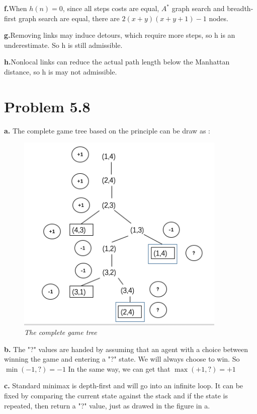 \documentclass[a4paper,left=2.5cm,right=2.5cm,11pt]{article}
\begin{document}
\textbf{f.}When $h(n)=0$, since all steps costs are equal, $A^*$ graph search and breadth-first graph search are equal, there are $2(x+y)(x+y+1) - 1$ nodes. \par

\textbf{g.}Removing links may induce detours, which require more steps, so h is an underestimate. So h is still admissible. \par

\textbf{h.}Nonlocal links can reduce the actual path length below the Manhattan distance, so h is may not admissible.


\section{Problem 5.8}
\textbf{a.}  The complete game tree based on the principle can be draw as :
\begin{figure}[ht]
\centering
\includegraphics[width=10cm]{2.png}  
\caption*{\small\it The complete game tree}
\end{figure}

\textbf{b.}   The "?" values are handed by assuming that an agent with a choice between winning the game and entering a "?" state. We will always choose to win.
So $\min(-1,?) = -1$
In the same way, we can get that $\max(+1,?) = +1$

\textbf{c.} Standard minimax is depth-first and will go into an infinite loop. It can be fixed by comparing the current state against the stack and if the state is repeated, then return a "?" value, just as drawed in the figure in a.
\end{document}
